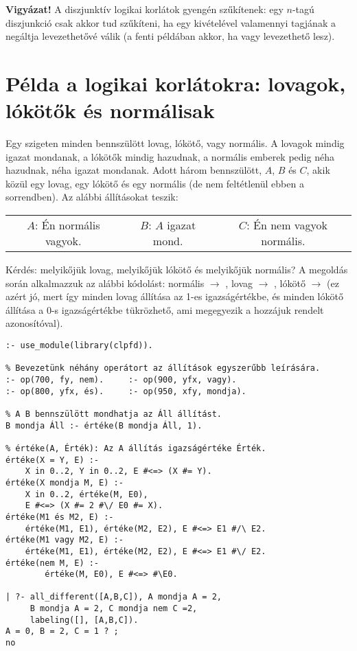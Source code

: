 {\bf Vigyázat!} A diszjunktív logikai korlátok gyengén szűkítenek: egy $n$-tagú
diszjunkció csak akkor tud szűkíteni, ha egy kivételével valamennyi tagjának a
negáltja levezethetővé válik (a fenti példában akkor, ha  vagy 
levezethető lesz).

\section{Példa a logikai korlátokra: lovagok, lókötők és normálisak}

Egy szigeten minden bennszülött lovag, lókötő, vagy normális. A lovagok mindig
igazat mondanak, a lókötők mindig hazudnak, a normális emberek pedig néha
hazudnak, néha igazat mondanak. Adott három bennszülött, $A$, $B$ és $C$, akik
közül egy lovag, egy lókötő és egy normális (de nem feltétlenül ebben a sorrendben).
Az alábbi állításokat teszik:

\begin{center}\begin{tabular}{ccc}
$A$: Én normális vagyok. & $B$: $A$ igazat mond. & $C$: Én nem vagyok normális.
\end{tabular}\end{center}

Kérdés: melyikőjük lovag, melyikőjük lókötő és melyikőjük normális?
\br
A \clpfd megoldás során alkalmazzuk az alábbi kódolást: normális $\to$ ,
lovag $\to$ , lókötő $\to$  (ez azért jó, mert így minden lovag
állítása az 1-es igazságértékbe, és minden lókötő állítása a 0-s igazságértékbe
tükrözhető, ami megegyezik a hozzájuk rendelt azonosítóval).

\begin{verbatim}
:- use_module(library(clpfd)).

% Bevezetünk néhány operátort az állítások egyszerűbb leírására.
:- op(700, fy, nem).     :- op(900, yfx, vagy).
:- op(800, yfx, és).     :- op(950, xfy, mondja).

% A B bennszülött mondhatja az Áll állítást.
B mondja Áll :- értéke(B mondja Áll, 1).

% értéke(A, Érték): Az A állítás igazságértéke Érték.
értéke(X = Y, E) :-
    X in 0..2, Y in 0..2, E #<=> (X #= Y).
értéke(X mondja M, E) :-
    X in 0..2, értéke(M, E0),
    E #<=> (X #= 2 #\/ E0 #= X).
értéke(M1 és M2, E) :-
    értéke(M1, E1), értéke(M2, E2), E #<=> E1 #/\ E2.
értéke(M1 vagy M2, E) :-
    értéke(M1, E1), értéke(M2, E2), E #<=> E1 #\/ E2.
értéke(nem M, E) :-
        értéke(M, E0), E #<=> #\E0.

| ?- all_different([A,B,C]), A mondja A = 2,
     B mondja A = 2, C mondja nem C =2,
     labeling([], [A,B,C]).
A = 0, B = 2, C = 1 ? ;
no
\end{verbatim}

